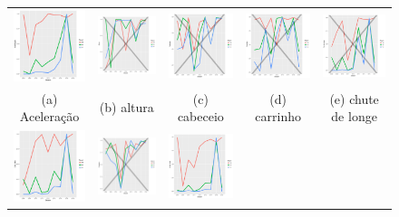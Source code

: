 \documentclass[review]{elsarticle}
\begin{document}
\begin{figure}
\begin{tabular}{ccccc}
  \includegraphics[width=25mm]{aceleracao_result_trans_media} & \includegraphics[width=25mm]{altura_result_trans_media} & \includegraphics[width=25mm]{cabeceio_result_trans_media} &   \includegraphics[width=25mm]{carrinho_result_trans_media} &
  \includegraphics[width=25mm]{ch_delonge_result_trans_media} \\
\scriptsize{(a) Aceleração } & \scriptsize{(b) altura  } & \scriptsize{(c) cabeceio } & \scriptsize{(d) carrinho } & \scriptsize{(e) chute de longe }\\[3pt]
\includegraphics[width=25mm]{cobr_falta_result_trans_media} & \includegraphics[width=25mm]{combativ__result_trans_media} &   \includegraphics[width=25mm]{contr_bola_result_trans_media} &

\end{tabular}
\end{figure}
\end{document}
